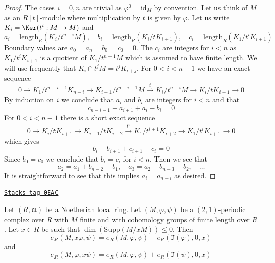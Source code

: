 \begin{proof}
The cases $i = 0, n$ are trivial as $\varphi^0 = \text{id}_M$ by convention.
Let us think of $M$ as an $R[t]$-module where multiplication by $t$
is given by $\varphi$. Let us write
$K_i = \Ker(t^i : M \to M)$ and
$$
a_i = \text{length}_R(K_i/t^{n - i}M),\quad
b_i = \text{length}_R(K_i/tK_{i + 1}),\quad
c_i = \text{length}_R(K_1/t^iK_{i + 1})
$$
Boundary values are $a_0 = a_n = b_0 = c_0 = 0$.
The $c_i$ are integers for $i < n$ as $K_1/t^iK_{i + 1}$
is a quotient of $K_1/t^{n - 1}M$ which is assumed to have finite length.
We will use frequently that $K_i \cap t^jM = t^jK_{i + j}$.
For $0 < i < n - 1$ we have an exact sequence
$$
0 \to
K_1/t^{n - i - 1}K_{n - i} \to
K_{i + 1}/t^{n - i - 1}M \xrightarrow{t} K_i/t^{n - i}M
\to K_i/tK_{i + 1} \to 0
$$
By induction on $i$ we conclude that $a_i$ and $b_i$ are
integers for $i < n$ and that
$$
c_{n - i - 1} - a_{i + 1} + a_i - b_i = 0
$$
For $0 < i < n - 1$ there is a short exact sequence
$$
0 \to
K_i/tK_{i + 1} \to
K_{i + 1}/tK_{i + 2} \xrightarrow{t^i}
K_1/t^{i + 1}K_{i + 2} \to
K_1/t^iK_{i + 1} \to 0
$$
which gives
$$
b_i - b_{i + 1} + c_{i + 1} - c_i = 0
$$
Since $b_0 = c_0$ we conclude that $b_i = c_i$ for $i < n$.
Then we see that
$$
a_2 = a_1 + b_{n - 2} - b_1,\quad
a_3 = a_2 + b_{n - 3} - b_2,\quad \ldots
$$
It is straightforward to see that this implies $a_i = a_{n - i}$ as desired.
\end{proof}

\begin{lemma}
\label{chow-lemma-multiply-period-length}
\href{https://stacks.math.columbia.edu/tag/0EAC}{\texttt{Stacks tag 0EAC}}

Let $(R, \mathfrak m)$ be a Noetherian local ring. Let
$(M, \varphi, \psi)$ be a $(2, 1)$-periodic complex over $R$
with $M$ finite and with cohomology groups of finite length over $R$.
Let $x \in R$ be such that $\dim(\text{Supp}(M/xM)) \leq 0$. Then
$$
e_R(M, x\varphi, \psi) = e_R(M, \varphi, \psi) - e_R(\Im(\varphi), 0, x)
$$
and
$$
e_R(M, \varphi, x\psi) = e_R(M, \varphi, \psi) + e_R(\Im(\psi), 0, x)
$$
\end{lemma}

